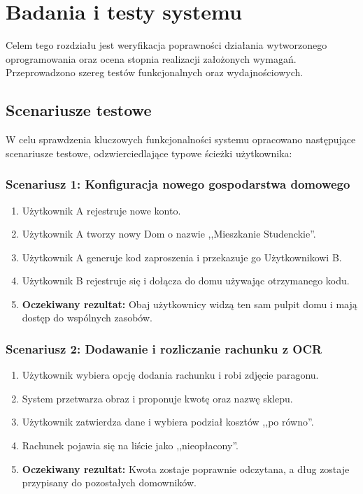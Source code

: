 \chapter{Badania i testy systemu}
\label{rozdzial5}

Celem tego rozdziału jest weryfikacja poprawności działania wytworzonego oprogramowania oraz ocena stopnia realizacji założonych wymagań. Przeprowadzono szereg testów funkcjonalnych oraz wydajnościowych.

\section{Scenariusze testowe}

W celu sprawdzenia kluczowych funkcjonalności systemu opracowano następujące scenariusze testowe, odzwierciedlające typowe ścieżki użytkownika:

\subsection{Scenariusz 1: Konfiguracja nowego gospodarstwa domowego}
\begin{enumerate}
    \item Użytkownik A rejestruje nowe konto.
    \item Użytkownik A tworzy nowy Dom o nazwie ,,Mieszkanie Studenckie''.
    \item Użytkownik A generuje kod zaproszenia i przekazuje go Użytkownikowi B.
    \item Użytkownik B rejestruje się i dołącza do domu używając otrzymanego kodu.
    \item \textbf{Oczekiwany rezultat:} Obaj użytkownicy widzą ten sam pulpit domu i mają dostęp do wspólnych zasobów.
\end{enumerate}

\subsection{Scenariusz 2: Dodawanie i rozliczanie rachunku z OCR}
\begin{enumerate}
    \item Użytkownik wybiera opcję dodania rachunku i robi zdjęcie paragonu.
    \item System przetwarza obraz i proponuje kwotę oraz nazwę sklepu.
    \item Użytkownik zatwierdza dane i wybiera podział kosztów ,,po równo''.
    \item Rachunek pojawia się na liście jako ,,nieopłacony''.
    \item \textbf{Oczekiwany rezultat:} Kwota zostaje poprawnie odczytana, a dług zostaje przypisany do pozostałych domowników.
\end{enumerate}

